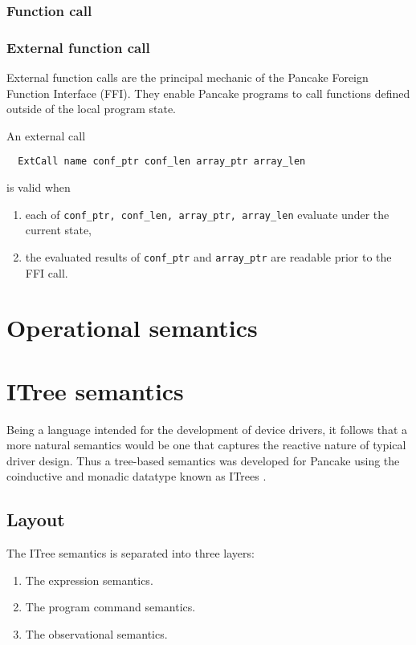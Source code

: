 \documentclass[a4paper]{amsbook}
\begin{document}
\subsubsection{Function call}
\label{sec:function-call}

\subsubsection{External function call}
\label{sec:external-call}

External function calls are the principal mechanic of the Pancake Foreign Function Interface (FFI). They enable Pancake programs to call functions defined outside of the local program state.

An external call
\begin{lstlisting}
  ExtCall name conf_ptr conf_len array_ptr array_len
\end{lstlisting}
is valid when
\begin{enumerate}
  \item each of \lstinline!conf_ptr, conf_len, array_ptr, array_len! evaluate under the current state,
  \item the evaluated results of \lstinline!conf_ptr! and \lstinline!array_ptr! are readable prior to the FFI call.
\end{enumerate}

\section{Operational semantics}
\label{sec:oper-semant}

\section{ITree semantics}
\label{sec:itree-semantics}

Being a language intended for the development of device drivers, it follows that a more natural semantics would be one that captures the reactive nature of typical driver design. Thus a tree-based semantics was developed for Pancake using the coinductive and monadic datatype known as ITrees \cite{xia_executable_nodate}.

\subsection{Layout}
\label{sec:layout}

The ITree semantics is separated into three layers:
\begin{enumerate}
  \item The expression semantics.
  \item The program command semantics.
  \item The observational semantics.
\end{enumerate}
\end{document}
